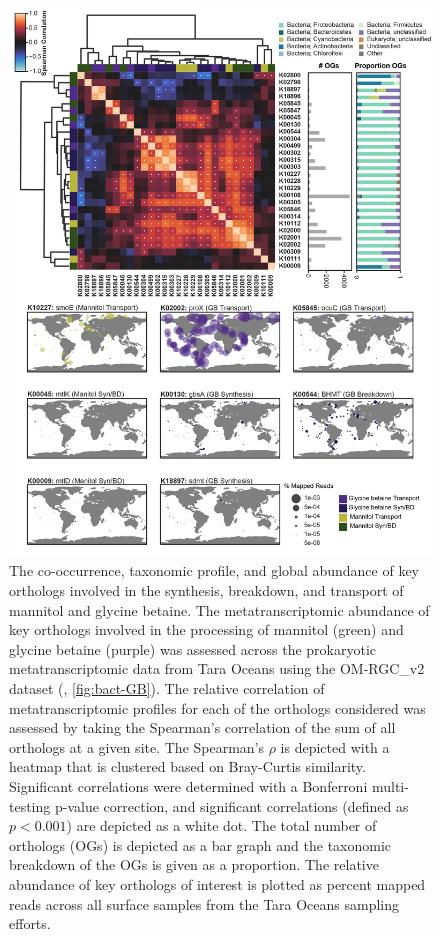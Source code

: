 \documentclass[utf8]{frontiersSCNS} %
\begin{document}
\begin{figure}[h!]
    \centering
    \includegraphics[width=0.75\columnwidth]{Figures/Tara_composite-01.png}
    \caption{The co-occurrence, taxonomic profile, and global abundance of key orthologs involved in the synthesis, breakdown, and transport of mannitol and glycine betaine. The metatranscriptomic abundance of key orthologs involved in the processing of mannitol (green) and glycine betaine (purple) was assessed across the prokaryotic metatranscriptomic data from Tara Oceans using the OM-RGC\_v2 dataset (, \ref{fig:bact-GB}). The relative correlation of metatranscriptomic profiles for each of the orthologs considered was assessed by taking the Spearman's correlation of the sum of all orthologs at a given site. The Spearman's $\rho$ is depicted with a heatmap that is clustered based on Bray-Curtis similarity. Significant correlations were determined with a Bonferroni multi-testing p-value correction, and significant correlations (defined as $p<0.001$) are depicted as a white dot. The total number of orthologs (OGs) is depicted as a bar graph and the taxonomic breakdown of the OGs is given as a proportion. The relative abundance of key orthologs of interest is plotted as percent mapped reads across all surface samples from the Tara Oceans sampling efforts.  }
    \label{fig:tarabact}
\end{figure}
\end{document}
